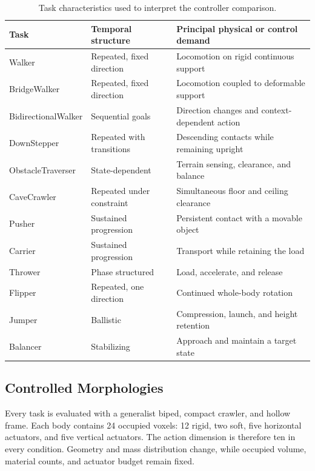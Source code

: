\begin{table}[htbp]
  \centering
  \scriptsize
  \caption{Task characteristics used to interpret the controller comparison.}
  \label{tab:extended-task-demands}
  \begin{tabularx}{\textwidth}{@{}l>{\raggedright\arraybackslash}p{}>{\raggedright\arraybackslash}X@{}}
    \toprule
    Task & Temporal structure & Principal physical or control demand \\
    \midrule
    Walker & Repeated, fixed direction & Locomotion on rigid continuous support \\
    BridgeWalker & Repeated, fixed direction & Locomotion coupled to deformable support \\
    BidirectionalWalker & Sequential goals & Direction changes and context-dependent action \\
    DownStepper & Repeated with transitions & Descending contacts while remaining upright \\
    ObstacleTraverser & State-dependent & Terrain sensing, clearance, and balance \\
    CaveCrawler & Repeated under constraint & Simultaneous floor and ceiling clearance \\
    Pusher & Sustained progression & Persistent contact with a movable object \\
    Carrier & Sustained progression & Transport while retaining the load \\
    Thrower & Phase structured & Load, accelerate, and release \\
    Flipper & Repeated, one direction & Continued whole-body rotation \\
    Jumper & Ballistic & Compression, launch, and height retention \\
    Balancer & Stabilizing & Approach and maintain a target state \\
    \bottomrule
  \end{tabularx}
\end{table}

\subsection{Controlled Morphologies}

Every task is evaluated with a generalist biped, compact crawler, and hollow frame. Each body contains 24 occupied voxels: 12 rigid, two soft, five horizontal actuators, and five vertical actuators. The action dimension is therefore ten in every condition. Geometry and mass distribution change, while occupied volume, material counts, and actuator budget remain fixed.

